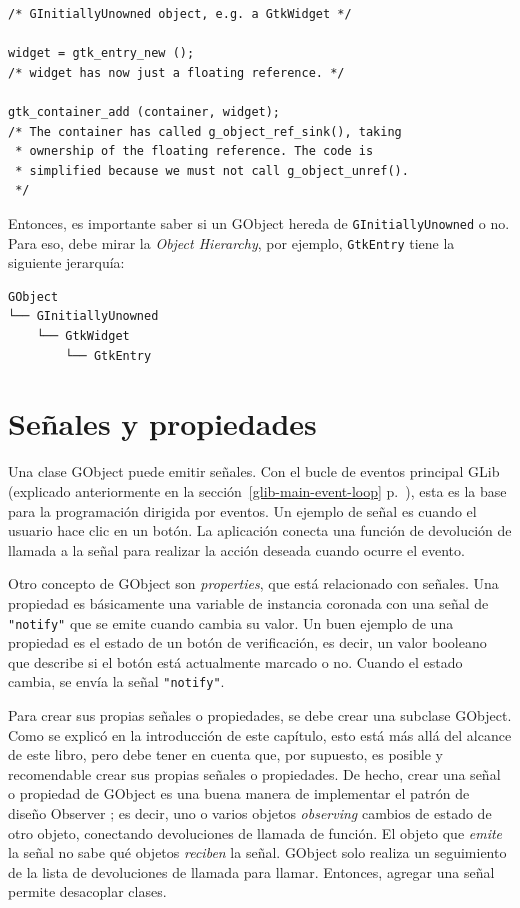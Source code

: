 \begin{lstlisting}[float=p, caption={Memory management of GObjects deriving from \lstinline{GInitiallyUnowned}.}, label=oop-gobject-mem-management-floating]
/* GInitiallyUnowned object, e.g. a GtkWidget */

widget = gtk_entry_new ();
/* widget has now just a floating reference. */

gtk_container_add (container, widget);
/* The container has called g_object_ref_sink(), taking
 * ownership of the floating reference. The code is
 * simplified because we must not call g_object_unref().
 */
\end{lstlisting}

Entonces, es importante saber si un GObject hereda de \lstinline{GInitiallyUnowned} o no. Para eso, debe mirar la \emph{Object Hierarchy}, por ejemplo, \lstinline{GtkEntry} tiene la siguiente jerarquía:

\begin{verbatim}
GObject
└── GInitiallyUnowned
    └── GtkWidget
        └── GtkEntry
\end{verbatim}

\section{Señales y propiedades}
\label{oop-gobject-signals-and-properties}

Una clase GObject puede emitir señales. Con el bucle de eventos principal GLib (explicado anteriormente en la sección~\ref{glib-main-event-loop} p.~\pageref{glib-main-event-loop}), esta es la base para la programación dirigida por eventos. Un ejemplo de señal es cuando el usuario hace clic en un botón. La aplicación conecta una función de devolución de llamada a la señal para realizar la acción deseada cuando ocurre el evento.

Otro concepto de GObject son \emph{properties}, que está relacionado con señales. Una propiedad es básicamente una variable de instancia coronada con una señal de \lstinline{"notify"} que se emite cuando cambia su valor. Un buen ejemplo de una propiedad es el estado de un botón de verificación, es decir, un valor booleano que describe si el botón está actualmente marcado o no. Cuando el estado cambia, se envía la señal \lstinline{"notify"}.

Para crear sus propias señales o propiedades, se debe crear una subclase GObject. Como se explicó en la introducción de este capítulo, esto está más allá del alcance de este libro, pero debe tener en cuenta que, por supuesto, es posible y recomendable crear sus propias señales o propiedades. De hecho, crear una señal o propiedad de GObject es una buena manera de implementar el patrón de diseño Observer \cite{design-patterns-book}; es decir, uno o varios objetos \emph{observing} cambios de estado de otro objeto, conectando devoluciones de llamada de función. El objeto que \emph{emite} la señal no sabe qué objetos \emph{reciben} la señal. GObject solo realiza un seguimiento de la lista de devoluciones de llamada para llamar. Entonces, agregar una señal permite desacoplar clases.

